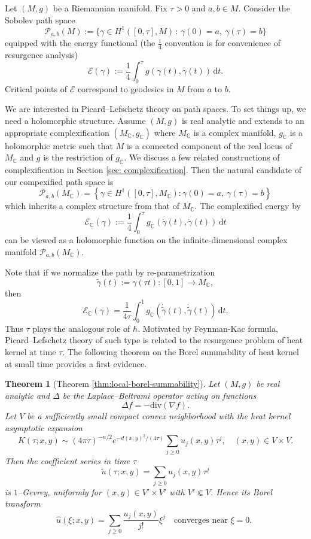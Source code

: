 \documentclass[11pt]{amsart}
\theoremstyle{plain}
\newtheorem{thm}{Theorem}[section]
\theoremstyle{definition}
\newcommand{\C}{\mathbb{C}}
\newcommand{\dd}{\mathrm d}
\newcommand{\PP}{\mathcal{P}}
\begin{document}
Let $(M,g)$ be a Riemannian manifold. Fix $\tau>0$ and $a,b\in M$. Consider the Sobolev path space
\[
\PP_{a,b}(M):=
\bigl\{\gamma\in H^{1}([0,\tau],M)\,:\,\gamma(0)=a,\ \gamma(\tau)=b\bigr\}
\]
equipped with the energy functional (the $\frac{1}{4}$ convention is for convenience of resurgence analysis)
\[
\mathcal E(\gamma):=\frac{1}{4}\int_{0}^{\tau}g(\dot\gamma(t),\dot{\gamma}(t))\,\dd t.
\]
Critical points of $\mathcal E$ correspond to geodesics in $M$ from $a$ to $b$. 

We are interested in Picard–Lefschetz theory on path spaces. To set things up, we need a holomorphic structure. Assume $(M,g)$ is real analytic and extends to {an appropriate} complexification  $(M_\C,g_{\C})$ where $M_{\C}$ is a complex manifold, $g_{\C}$ is a holomorphic metric such that $M$ is a connected component of the real locus of $M_{\C}$ and $g$ is the restriction of $g_{\C}$. We discuss a few related constructions of complexification in Section \ref{sec: complexification}. Then the natural candidate of our compexified path space is 
\[
\mathcal P_{a,b}(M_{\C})
=\left\{\gamma\in H^1([0,\tau],M_{\C}) :
\gamma(0)=a,\ \gamma(\tau)=b\right\}
\]
which inherits a complex structure from that of $M_{\C}$.  The complexified energy by
\[
\mathcal E_{\C}(\gamma)
:=
\frac{1}{4}\int_0^\tau
g_{\C}(\dot\gamma(t),\dot\gamma(t))\,\dd t
\]
can be viewed as a holomorphic function on the infinite-dimensional complex manifold $\mathcal P_{a,b}(M_{\C})$. 

Note that if we normalize the path by re-parametrization 
$$
\tilde \gamma(t):=\gamma(\tau t): [0,1]\to M_{\C},
$$
then 
$$
\mathcal E_{\C}(\gamma)=\frac{1}{4\tau}\int_0^1
g_{\C}(\dot{\tilde\gamma}(t),\dot{\tilde \gamma}(t))\,\dd t.
$$
Thus $\tau$ plays the analogous role of $\hbar$. Motivated by Feynman-Kac formula, Picard–Lefschetz theory of such type is related to the resurgence problem of heat kernel at time $\tau$. The following theorem on the Borel summability of heat kernel at small time provides a first evidence. 

\begin{thm}[Theorem \ref{thm:local-borel-summability}]
\label{thm:local-borel-summability-introduction}
Let $(M,g)$ be real analytic and $\Delta$ be the  Laplace--Beltrami
operator acting on functions
\[
  \Delta f = - \mathrm{div}(\nabla f).
\]
Let $V$ be a sufficiently small compact
convex neighborhood with the heat kernel asymptotic expansion 
\[
K(\tau;x,y)\sim (4\pi \tau)^{-n/2}e^{-d(x,y)^2/(4\tau)}\sum_{j\ge0}u_j(x,y)\tau^j, \quad (x,y)\in V\times V. 
\]
Then the coefficient series in time $\tau$
\[
\widetilde u(\tau;x,y)=\sum_{j\ge0}u_j(x,y)\tau^j
\]
is $1$--Gevrey, uniformly for $(x,y)\in V'\times V'$ with
$V'\Subset V$.  Hence its Borel transform
\[
\widehat u(\xi;x,y)=\sum_{j\ge0}\frac{u_j(x,y)}{j!}\xi^j\quad \text{converges near $\xi=0$.  }
\]
\end{thm}
\end{document}
